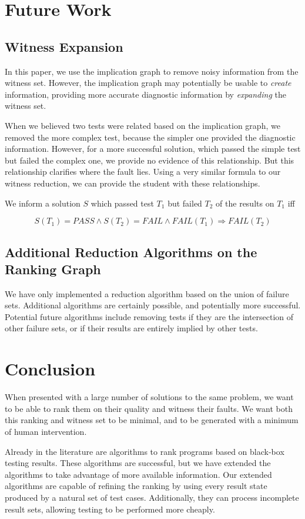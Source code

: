 \documentclass[11pt,twoside]{article}
\newcommand\fail{\mathit{FAIL}}
\theoremstyle{definition}
\begin{document}
\section{Future Work}
\subsection{Witness Expansion}

In this paper, we use the implication graph to remove noisy information from the witness set. However, the implication graph may potentially be usable to \emph{create} information, providing more accurate diagnostic information by \emph{expanding} the witness set. 

When we believed two tests were related based on the implication graph, we removed the more complex test, because the simpler one provided the diagnostic information. However, for a more successful solution, which passed the simple test but failed the complex one, we provide no evidence of this relationship. But this relationship clarifies where the fault lies. Using a very similar formula to our witness reduction, we can provide the student with these relationships.

\centerline{We inform a solution $S$ which passed test $T_1$ but failed $T_2$ of the results on  $T_1$ iff}
$$ S(T_1) = PASS \wedge S(T_2) = \fail \wedge \fail(T_1) \Rightarrow \fail(T_2)$$

\subsection{Additional Reduction Algorithms on the Ranking Graph}

We have only implemented a reduction algorithm based on the union of failure sets. Additional algorithms are certainly possible, and potentially more successful. Potential future algorithms include removing tests if they are the intersection of other failure sets, or if their results are entirely implied by other tests.

\section{Conclusion}
When presented with a large number of solutions to the same problem, we want to be able to rank them on their quality and witness their faults. We want both this ranking and witness set to be minimal, and to be generated with a minimum of human intervention.

Already in the literature are algorithms to rank programs based on black-box testing results. These algorithms are successful, but we have extended the algorithms to take advantage of more available information. Our extended algorithms are capable of refining the ranking by using every result state produced by a natural set of test cases. Additionally, they can process incomplete result sets, allowing testing to be performed more cheaply.
\end{document}
